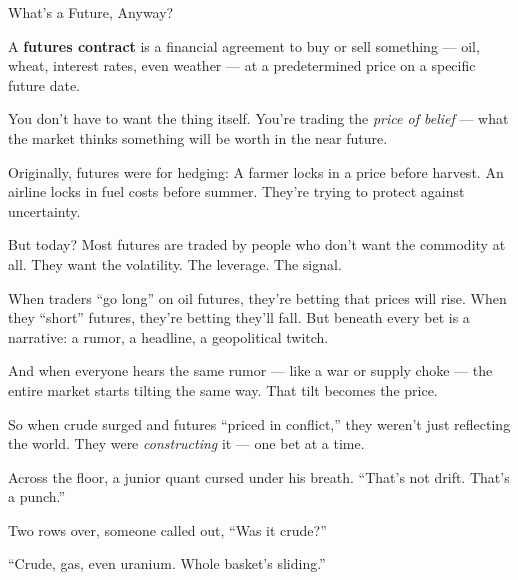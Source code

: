 \begin{TechnicalSidebar}{What’s a Future, Anyway?}

  A \textbf{futures contract} is a financial agreement to buy or sell something — oil, wheat, interest rates, even 
  weather — at a predetermined price on a specific future date.

  \medskip
  
  You don’t have to want the thing itself.  
  You’re trading the \textit{price of belief} — what the market thinks something will be worth in the near future.
  
  \medskip
  
  Originally, futures were for hedging:  
  A farmer locks in a price before harvest. An airline locks in fuel costs before summer.  
  They’re trying to protect against uncertainty.

  \medskip
  
  But today?  
  Most futures are traded by people who don’t want the commodity at all.  
  They want the volatility. The leverage. The signal.
  
  \medskip
  
  When traders “go long” on oil futures, they’re betting that prices will rise.  
  When they “short” futures, they’re betting they’ll fall.  
  But beneath every bet is a narrative: a rumor, a headline, a geopolitical twitch.

  \medskip
  
  And when everyone hears the same rumor — like a war or supply choke — the entire market starts tilting the same way.  
  That tilt becomes the price.
  
  \medskip
  
  So when crude surged and futures “priced in conflict,” they weren’t just reflecting the world.  
  They were \textit{constructing} it — one bet at a time.
  
\end{TechnicalSidebar}

\medskip

Across the floor, a junior quant cursed under his breath. “That’s not drift. That’s a punch.”

Two rows over, someone called out, “Was it crude?”

“Crude, gas, even uranium. Whole basket’s sliding.”


